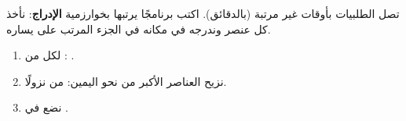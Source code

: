 \begin{statement}
تصل الطلبيات بأوقات غير مرتبة (بالدقائق). اكتب برنامجًا يرتبها بخوارزمية \textbf{الإدراج}: نأخذ كل عنصر وندرجه في مكانه في الجزء المرتب على يساره.
\end{statement}
\begin{stepsbox}\begin{enumerate}
\item لكل  من : .
\item نزيح العناصر الأكبر من  نحو اليمين:  من  نزولًا.
\item نضع  في .
\end{enumerate}\end{stepsbox}
